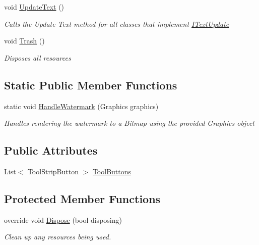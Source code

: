 \begin{DoxyCompactItemize}
void \mbox{\hyperlink{class_paint___program_1_1_canvas_ad80b3ef48814a229e01a330b49344f3b}{Update\+Text}} ()
\begin{DoxyCompactList}\small\item\em Calls the Update Text method for all classes that implement \mbox{\hyperlink{interface_paint___program_1_1_i_text_update}{I\+Text\+Update}} \end{DoxyCompactList}\item 
void \mbox{\hyperlink{class_paint___program_1_1_canvas_ac7d12ff2474d5bca00d8d399f0f6f17f}{Trash}} ()
\begin{DoxyCompactList}\small\item\em Disposes all resources \end{DoxyCompactList}\end{DoxyCompactItemize}
\subsection*{Static Public Member Functions}
\begin{DoxyCompactItemize}
\item 
static void \mbox{\hyperlink{class_paint___program_1_1_canvas_a94533b18db7d150d723ecaaf789d406b}{Handle\+Watermark}} (Graphics graphics)
\begin{DoxyCompactList}\small\item\em Handles rendering the watermark to a Bitmap using the provided Graphics object \end{DoxyCompactList}\end{DoxyCompactItemize}
\subsection*{Public Attributes}
\begin{DoxyCompactItemize}
\item 
List$<$ Tool\+Strip\+Button $>$ \mbox{\hyperlink{class_paint___program_1_1_canvas_ada97231f783b6eb308b9e54523729bd5}{Tool\+Buttons}}
\end{DoxyCompactItemize}
\subsection*{Protected Member Functions}
\begin{DoxyCompactItemize}
\item 
override void \mbox{\hyperlink{class_paint___program_1_1_canvas_aafaa253cb056ff1725f6c1c7c74895a7}{Dispose}} (bool disposing)
\begin{DoxyCompactList}\small\item\em Clean up any resources being used. \end{DoxyCompactList}\end{DoxyCompactItemize}
